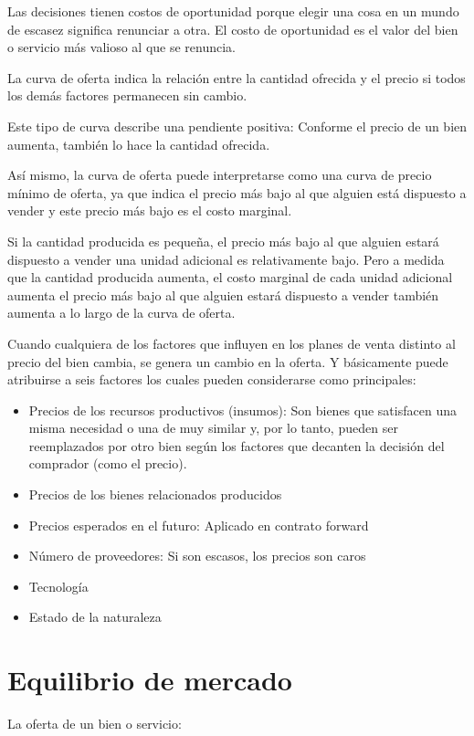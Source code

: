 \begin{definition}
    Las decisiones tienen costos de oportunidad porque elegir una cosa en un mundo de escasez significa renunciar a otra. El costo de oportunidad es el valor del bien o servicio más valioso al que se renuncia.
\end{definition}
La curva de oferta indica la relación entre la cantidad ofrecida y el precio si todos los demás factores permanecen sin cambio.

Este tipo de curva describe una pendiente positiva: Conforme el precio de un bien aumenta, también lo hace la cantidad ofrecida.

Así mismo, la curva de oferta puede interpretarse como una curva de precio mínimo de oferta, ya que indica el precio más bajo al que alguien está dispuesto a vender y este precio más bajo es el costo marginal.
\begin{definition}
    Si la cantidad producida es pequeña, el precio más bajo al que alguien estará dispuesto a vender una unidad adicional es relativamente bajo. Pero a medida que la cantidad producida aumenta, el costo marginal de cada unidad adicional aumenta el precio más bajo al que alguien estará dispuesto a vender también aumenta a lo largo de la curva de oferta.
\end{definition}
Cuando cualquiera de los factores que influyen en los planes de venta distinto al precio del bien cambia, se genera un cambio en la oferta. Y básicamente puede atribuirse a seis factores los cuales pueden considerarse como principales:
\begin{itemize}
    \item Precios de los recursos productivos (insumos): Son bienes que satisfacen una misma necesidad o una de muy similar y, por lo tanto, pueden ser reemplazados por otro bien según los factores que decanten la decisión del comprador (como el precio).
    \item Precios de los bienes relacionados producidos
    \item Precios esperados en el futuro: Aplicado en contrato forward
    \item Número de proveedores: Si son escasos, los precios son caros
    \item Tecnología
    \item Estado de la naturaleza
\end{itemize}
\section{Equilibrio de mercado}
La oferta de un bien o servicio:

